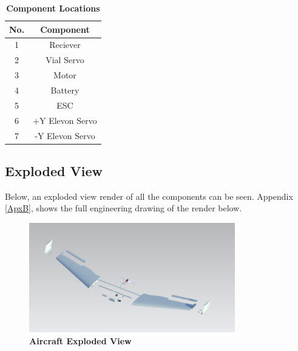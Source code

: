     \begin{table}[H]
    \begin{center}
    \caption{\textbf{Component Locations}} \label{tab:component_locations}
    \begin{tabular}{|c|c|} 
        \hline
        \textbf{No.} & \textbf{Component} \\ \hline
        1 & Reciever \\ \hline
        2 & Vial Servo \\ \hline
        3 & Motor \\ \hline
        4 & Battery \\ \hline
        5 & ESC \\ \hline
        6 & +Y Elevon Servo \\ \hline
        7 & -Y Elevon Servo \\ \hline
    \end{tabular}
    \end{center}
    \end{table}
    
    \subsection{Exploded View}
    Below, an exploded view render of all the components can be seen. Appendix \ref{ApxB}, shows the full engineering drawing of the render below.
        \begin{figure}[H]
            \centering
            \includegraphics[width=0.8\textwidth]{homeworks/homework4/report/Figure/aircraft_assembly_exploded.png}
            \caption{\textbf{Aircraft Exploded View}}
            \label{fig:exploded}
        \end{figure}
    
